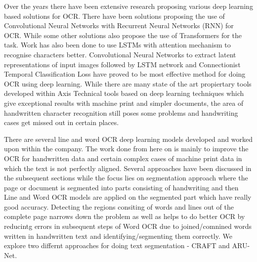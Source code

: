 Over the years there have been extensive research proposing various deep learning based solutions for OCR. There have been solutions proposing the use of Convolutional Neural Networks with Recurrent Neural Networks (RNN) for OCR. While some other solutions also propose the use of Transformers for the task. Work has also been done to use LSTMs with attention mechanism to recognise characters better. Convolutional Neural Networks to extract latent representations of input images followed by LSTM network and Connectionist Temporal Classification Loss have proved to be most effective method for doing OCR using deep learning. While there are many state of the art propiertary tools developed within Axis Technical tools based on deep learning techniques which give exceptional results with machine print and simpler documents, the area of handwritten character recognition still poses some problems and handwriting cases get missed out in certain places.

There are several line and word OCR deep learning models developed and worked upon within the company. The work done from here on is mainly to improve the OCR for handwritten data and certain complex cases of machine print data in which the text is not perfectly aligned. Several approaches have been discussed in the subsequent sections while the focus lies on segmentation approach where the page or document is segmented into parts consisting of handwriting and then Line and Word OCR models are applied on the segmented part which have really good accuracy. Detecting the regions consiting of words and lines out of the complete page narrows down the problem as well as helps to do better OCR by reducintg errors in subsequent steps of Word OCR due to joined/comnined words written in handwritten text and identifying/segmenting them correctly. We explore two differnt approaches for doing text segmentation - CRAFT and ARU-Net.

